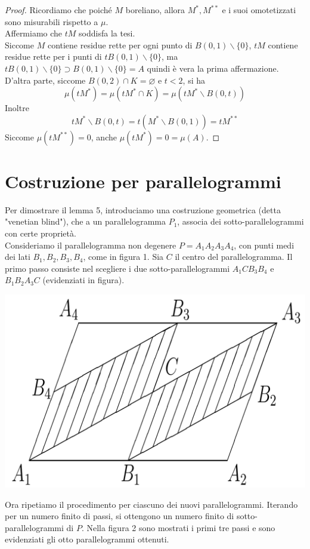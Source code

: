 \documentclass[a4paper, twoside,openright]{article}
\newcommand{\<}{\langle}
\renewcommand{\>}{\rangle}
\begin{document}
\begin{proof}
Ricordiamo che poiché $M$ boreliano, allora $M^*, M^{**}$ e i suoi omotetizzati sono misurabili rispetto a $\mu$.\\
Affermiamo che $t M$ soddisfa la tesi.\\
Siccome $M$ contiene residue rette per ogni punto di $B(0,1) \backslash\{0\}$, $t M$ contiene residue rette per i punti di $t B(0,1) \backslash\{0\}$, ma $t B(0,1) \backslash\{0\} \supset B(0,1) \backslash\{0\}=A$ quindi è vera la prima affermazione.\\
D'altra parte, siccome $B(0,2) \cap K=\varnothing$ e $t<2$, si ha
$$
\mu\left(t M^{*}\right)=\mu\left(t M^{*} \cap K\right)=\mu\left(t M^{*} \backslash B(0, t)\right)
$$
Inoltre
$$
t M^{*} \backslash B(0, t)=t\left(M^{*} \backslash B(0,1)\right)=t M^{* *}
$$
Siccome $\mu\left(t M^{* *}\right)=0$, anche $\mu (tM^*)= 0= \mu(A)$.

\end{proof}

\newpage

\section{Costruzione per parallelogrammi}

Per dimostrare il lemma 5, introduciamo una costruzione geometrica (detta "venetian blind"), che a un parallelogramma $P_1$, associa dei sotto-parallelogrammi con certe proprietà.\\
Consideriamo il parallelogramma non degenere $P=A_{1} A_{2} A_{3} A_{4}$, con punti medi dei lati $B_{1}, B_{2}, B_{3}, B_{4}$, come in figura 1. Sia $C$ il centro del parallelogramma. Il primo passo consiste nel scegliere i due sotto-parallelogrammi $A_{1} C B_{3} B_{4}$ e $B_{1} B_{2} A_{3} C$ (evidenziati in figura).

\begin{center}
	\includegraphics[width=0.5\columnwidth]{passo1.png}
\end{center}

Ora ripetiamo il procedimento per ciascuno dei nuovi parallelogrammi. Iterando per un numero finito di passi, si ottengono un numero finito di sotto-parallelogrammi di $P$. Nella figura 2 sono mostrati i primi tre passi e sono evidenziati gli otto parallelogrammi ottenuti.\\
\end{document}
